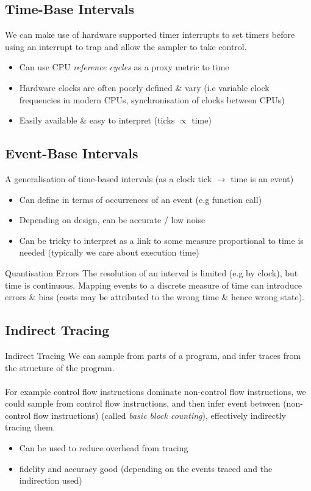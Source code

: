 \subsection{Time-Base Intervals}
We can make use of hardware supported timer interrupts to set timers before using an interrupt to trap and allow the sampler to take control.
\begin{itemize}
    \item Can use CPU \textit{reference cycles} as a proxy metric to time
    \item Hardware clocks are often poorly defined \& vary (i.e variable clock frequencies in modern CPUs, synchronisation of clocks between CPUs)
    \item Easily available \& easy to interpret (ticks $\propto$ time)
\end{itemize}

\subsection{Event-Base Intervals}
A generalisation of time-based intervals (as a clock tick $\to$ time is an event)
\begin{itemize}
    \item Can define in terms of occurrences of an event (e.g function call)
    \item Depending on design, can be accurate / low noise
    \item Can be tricky to interpret as a link to some measure proportional to time is needed (typically we care about execution time)
\end{itemize}

\begin{definitionbox}{Quantisation Errors}
    The resolution of an interval is limited (e.g by clock), but time is continuous. Mapping events to a discrete measure of time can introduce errors \& bias (costs may be attributed to the wrong time \& hence wrong state).
\end{definitionbox}

\subsection{Indirect Tracing}
\begin{definitionbox}{Indirect Tracing}
    We can sample from parts of a program, and infer traces from the structure of the program.
    \\
    \\ For example control flow instructions dominate non-control flow instructions, we could sample from control flow instructions, and then infer event between (non-control flow instructions) (called \textit{basic block counting}), effectively indirectly tracing them.
    \begin{itemize}
        \item Can be used to reduce overhead from tracing
        \item fidelity and accuracy good (depending on the events traced and the indirection used)
    \end{itemize}
\end{definitionbox}

